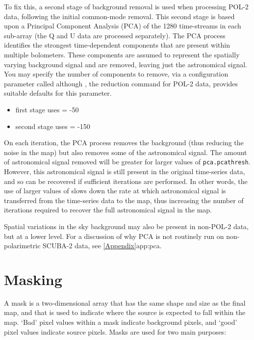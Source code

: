 To fix this, a second stage of background removal is used when processing
POL-2 data, following the initial common-mode removal. This second stage
is based upon a Principal Component Analysis (PCA) of the 1280
time-streams in each sub-array (the Q and U data are processed
separately). The PCA process identifies the strongest time-dependent
components that are present within multiple bolometers. These components
are assumed to represent the spatially varying background signal and are
removed, leaving just the astronomical signal. You may specify the number
of components to remove, via a  configuration
parameter called  although \poltwomap,
the reduction command for POL-2 data, provides suitable defaults for this parameter.

\begin{itemize}
\item first stage uses  = -50
\item second stage uses  = -150
\end{itemize}

On each  iteration, the PCA process removes the background (thus
reducing the noise in the map) but also removes some of the astronomical
signal. The amount of astronomical signal removed will be greater for
larger values of \texttt{pca.pcathresh}. However, this astronomical
signal is still present in the original time-series data, and so can be
recovered if sufficient  iterations are performed. In other words,
the use of larger values of  slows down the rate at
which astronomical signal is transferred from the time-series data to the
map, thus increasing the number of iterations required to recover the
full astronomical signal in the map.

Spatial variations in the sky background may also be present in non-POL-2
data, but at a lower level. For a discussion of why PCA is not routinely
run on non-polarimetric SCUBA-2 data, see \cref{Appendix}{app:pca}{}.



\section{Masking}
A mask is a two-dimensional array that has the same shape and size as
the final map, and that is used to indicate where the source is
expected to fall within the map. `Bad' pixel values within a mask
indicate background pixels, and `good' pixel values indicate source
pixels. Masks are used for two main purposes:

